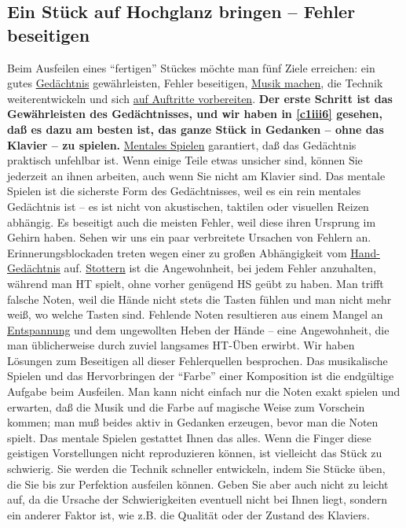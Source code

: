 
\subsection{Ein Stück auf Hochglanz bringen -- Fehler beseitigen}
\label{c1iii9}

Beim Ausfeilen eines \enquote{fertigen} Stückes möchte man fünf Ziele erreichen: ein gutes \hyperref[c1iii6]{Gedächtnis} gewährleisten, Fehler beseitigen, \hyperref[c1iii14d]{Musik machen}, die Technik weiterentwickeln und sich \hyperref[c1iii14]{auf Auftritte vorbereiten}.
\textbf{Der erste Schritt ist das Gewährleisten des Gedächtnisses, und wir haben in \autoref{c1iii6} gesehen, daß es dazu am besten ist, das ganze Stück in Gedanken -- ohne das Klavier -- zu spielen.}
\hyperref[c1ii12]{Mentales Spielen} garantiert, daß das Gedächtnis praktisch unfehlbar ist.
Wenn einige Teile etwas unsicher sind, können Sie jederzeit an ihnen arbeiten, auch wenn Sie nicht am Klavier sind.
Das mentale Spielen ist die sicherste Form des Gedächtnisses, weil es ein rein mentales Gedächtnis ist -- es ist nicht von akustischen, taktilen oder visuellen Reizen abhängig.
Es beseitigt auch die meisten Fehler, weil diese ihren Ursprung im Gehirn haben.
Sehen wir uns ein paar verbreitete Ursachen von Fehlern an.
Erinnerungsblockaden treten wegen einer zu großen Abhängigkeit vom \hyperref[c1iii6hand]{Hand-Gedächtnis} auf.
\hyperref[c1ii22]{Stottern} ist die Angewohnheit, bei jedem Fehler anzuhalten, während man HT spielt, ohne vorher genügend HS geübt zu haben.
Man trifft falsche Noten, weil die Hände nicht stets die Tasten fühlen und man nicht mehr weiß, wo welche Tasten sind.
Fehlende Noten resultieren aus einem Mangel an \hyperref[c1ii14]{Entspannung} und dem ungewollten Heben der Hände -- eine Angewohnheit, die man üblicherweise durch zuviel langsames HT-Üben erwirbt.
Wir haben Lösungen  zum Beseitigen all dieser Fehlerquellen besprochen.
Das musikalische Spielen und das Hervorbringen der \enquote{Farbe} einer Komposition ist die endgültige Aufgabe beim Ausfeilen.
Man kann nicht einfach nur die Noten exakt spielen und erwarten, daß die Musik und die Farbe auf magische Weise zum Vorschein kommen; man muß beides aktiv in Gedanken erzeugen, bevor man die Noten spielt.
Das mentale Spielen gestattet Ihnen das alles.
Wenn die Finger diese geistigen Vorstellungen nicht reproduzieren können, ist vielleicht das Stück zu schwierig.
Sie werden die Technik schneller entwickeln, indem Sie Stücke üben, die Sie bis zur Perfektion ausfeilen können.
Geben Sie aber auch nicht zu leicht auf, da die Ursache der Schwierigkeiten eventuell nicht bei Ihnen liegt, sondern ein anderer Faktor ist, wie z.B. die Qualität oder der Zustand des Klaviers.

